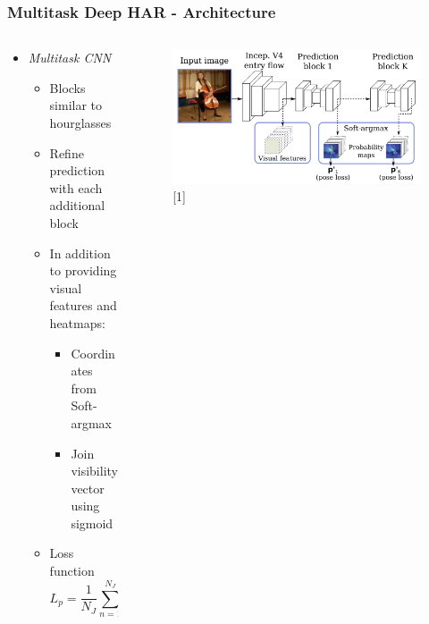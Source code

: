 \documentclass[9pt]{beamer}
\providecommand{\sourcefix}[1]{\\ \footnotesize \tugreen{Source:} [#1]}
\newenvironment{myframe}[1][]{%
\begin{frame}%
\frametitle{#1}
\setcounter{footnote}{0}


}{%
\end{frame}%
}
\begin{document}
\begin{myframe}[Multitask Deep HAR - Architecture]

    \begin{columns}[T]
        \begin{column}{.45\textwidth}
            \begin{itemize}
                \item \textit{Multitask CNN}
                \begin{itemize}
                    \item Blocks similar to hourglasses
                    \item Refine prediction with each additional block
                    \item In addition to providing visual features and heatmaps:
                    \begin{itemize}
                        \item Coordinates from Soft-argmax
                        \item Join visibility vector using sigmoid
                    \end{itemize}
                    \item Loss function $$L_p = \frac{1}{N_J}\sum_{n=1}^{N_J}(~ \lvert\lvert \hat{p}_n - p_n \rvert\rvert_1 ~+~ \lvert\lvert \hat{p}_n - p_n \rvert\rvert^2_2 ~ )$$
                \end{itemize}
            \end{itemize}
        \end{column}
        \begin{column}{.45\textwidth}
            \begin{figure}
                \includegraphics[width=.99\textwidth]{multitask-part.png}
                \sourcefix{1}
            \end{figure}
        \end{column}
	\end{columns}
\end{myframe}
\end{document}
